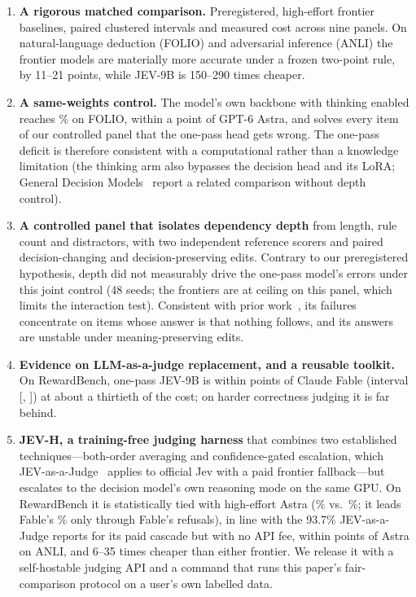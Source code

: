 \begin{enumerate}[leftmargin=1.4em,itemsep=2pt]
\item \textbf{A rigorous matched comparison.} Preregistered, high-effort frontier baselines, paired clustered intervals and measured cost across nine panels.
On natural-language deduction (FOLIO) and adversarial inference (ANLI) the frontier models are materially more accurate under a frozen two-point rule, by 11--21 points, while JEV-9B is 150--290 times cheaper.
\item \textbf{A same-weights control.}
The model's own backbone with thinking enabled reaches \AccFolioStwo\% on FOLIO, within a point of GPT-6 Astra, and solves every item of our controlled panel that the one-pass head gets wrong.
The one-pass deficit is therefore consistent with a computational rather than a knowledge limitation (the thinking arm also bypasses the decision head and its LoRA; General Decision Models~\citep{gdm2026} report a related comparison without depth control).
\item \textbf{A controlled panel that isolates dependency depth} from length, rule count and distractors, with two independent reference scorers and paired decision-changing and decision-preserving edits.
Contrary to our preregistered hypothesis, depth did not measurably drive the one-pass model's errors under this joint control (48 seeds; the frontiers are at ceiling on this panel, which limits the interaction test). Consistent with prior work~\citep{qmfol2026,harddecisions2026,jevout2026,premiseorder2024}, its failures concentrate on items whose answer is that nothing follows, and its answers are unstable under meaning-preserving edits.
\item \textbf{Evidence on LLM-as-a-judge replacement, and a reusable toolkit.}
On RewardBench, one-pass JEV-9B is within \AbsDeltaRbFable{} points of Claude Fable (interval [\LoRbFable, \HiRbFable]) at about a thirtieth of the cost; on harder correctness judging it is far behind.
\item \textbf{JEV-H, a training-free judging harness} that combines two established techniques---both-order averaging and confidence-gated escalation, which JEV-as-a-Judge~\citep{jevjudge2026} applies to official Jev with a paid frontier fallback---but escalates to the decision model's own reasoning mode on the same GPU.
On RewardBench it is statistically tied with high-effort Astra (\AccRbHarn\% vs.\ \AccRbAstra\%; it leads Fable's \AccRbFable\% only through Fable's refusals), in line with the 93.7\% JEV-as-a-Judge reports for its paid cascade but with no API fee, within \AbsDeltaHAnliAstra{} points of Astra on ANLI, and 6--35 times cheaper than either frontier.
We release it with a self-hostable judging API and a command that runs this paper's fair-comparison protocol on a user's own labelled data.
\end{enumerate}

